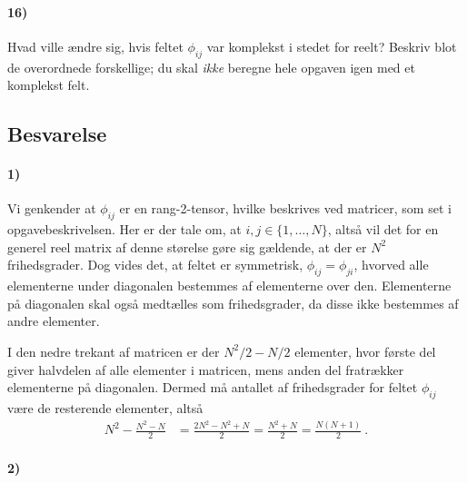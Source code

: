 \documentclass[../main.tex]{subfiles}
\begin{document}

\paragraph*{\textbf{16)}}

Hvad ville ændre sig, hvis feltet $\phi_{ij}$ var komplekst i stedet for reelt? Beskriv blot de overordnede forskellige; du skal \emph{ikke} beregne hele opgaven igen med et komplekst felt.



\subsection{Besvarelse}


\paragraph[1) Frihedsgrader for feltet $\phi_{ij}$]{\textbf{1)}}

Vi genkender at $\phi_{ij}$ er en rang-2-tensor, hvilke beskrives ved matricer, som set i opgavebeskrivelsen. Her er der tale om, at $i,j \in \{1,\ldots,N\}$, altså vil det for en generel reel matrix af denne størelse gøre sig gældende, at der er $N^2$ frihedsgrader. Dog vides det, at feltet er symmetrisk, $\phi_{ij} = \phi_{ji}$, hvorved alle elementerne under diagonalen bestemmes af elementerne over den. Elementerne på diagonalen skal også medtælles som frihedsgrader, da disse ikke bestemmes af andre elementer.

I den nedre trekant af matricen er der $N^2/2 - N/2$ elementer, hvor første del giver halvdelen af alle elementer i matricen, mens anden del fratrækker elementerne på diagonalen. Dermed må antallet af frihedsgrader for feltet $\phi_{ij}$ være de resterende elementer, altså
\begin{align}
    N^2 - \frac{N^2 - N}{2} &= \frac{2N^2 - N^2 + N}{2}
        = \frac{N^2 + N}{2}
        = \frac{N(N+1)}{2} \: .
\end{align}



\paragraph[2) Bevægelsesligningerne for $\psi_{ij}$]{\textbf{2)}}
\end{document}
